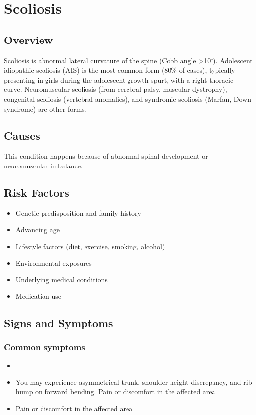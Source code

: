 \chapter{Scoliosis}
\label{sec:Scoliosis}

\section{Overview}
Scoliosis is abnormal lateral curvature of the spine (Cobb angle >10$^\circ$). Adolescent idiopathic scoliosis (AIS) is the most common form (80\% of cases), typically presenting in girls during the adolescent growth spurt, with a right thoracic curve. Neuromuscular scoliosis (from cerebral palsy, muscular dystrophy), congenital scoliosis (vertebral anomalies), and syndromic scoliosis (Marfan, Down syndrome) are other forms.
\section{Causes}
This condition happens because of abnormal spinal development or neuromuscular imbalance.     
\section{Risk Factors}

\begin{itemize}[noitemsep]
  \item Genetic predisposition and family history
  \item Advancing age
  \item Lifestyle factors (diet, exercise, smoking, alcohol)
  \item Environmental exposures
  \item Underlying medical conditions
  \item Medication use
\end{itemize}
\section{Signs and Symptoms}

\subsection{Common symptoms}
\begin{itemize}[noitemsep]
  \item \item You may experience asymmetrical trunk, shoulder height discrepancy, and rib hump on forward bending. Pain or discomfort in the affected area    \item Pain or discomfort in the affected area
  \end{itemize}

